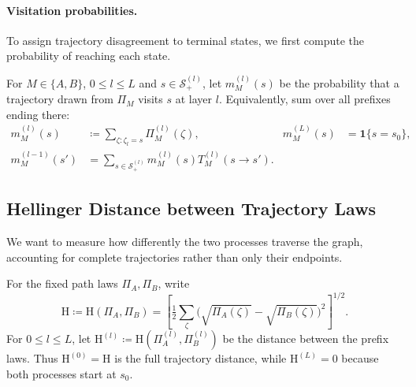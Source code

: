 \paragraph{Visitation probabilities.}\label{ptnb:sec:lmp-marginals}
To assign trajectory disagreement to terminal states, we first compute the probability of reaching each state.
\begin{definition}\label{def:trajectory_marginals}
For $M\in\{A,B\}$, $0\le l\le L$ and $s\in\mathcal S_+^{(l)}$, let $m_M^{(l)}(s)$ be the probability that a trajectory drawn from $\Pi_M$ visits $s$ at layer $l$. Equivalently, sum over all prefixes ending there:
\begin{align}
 m_M^{(l)}(s)&\coloneqq\sum_{\zeta:\zeta_l=s}\Pi_M^{(l)}(\zeta),
 &m_M^{(L)}(s)&=\mathbf1\{s=s_0\},\label{ptnb:eq:lmp-alpha}\\
 m_M^{(l-1)}(s')&=\sum_{s\in\mathcal S^{(l)}_+}m_M^{(l)}(s)T_M^{(l)}(s\to s').\label{ptnb:eq:lmp-alpha-recursion}
\end{align}
\end{definition}

\subsection{Hellinger Distance between Trajectory Laws}\label{ptnb:sec:lmp-bc}

We want to measure how differently the two processes traverse the graph, accounting for complete trajectories rather than only their endpoints.
\begin{definition}\label{def:trajectory_hellinger}
For the fixed path laws $\Pi_A,\Pi_B$, write
\[
 \mathrm H\coloneqq\mathrm H(\Pi_A,\Pi_B)
 =\left[\tfrac12\sum_{\zeta}
 \bigl(\sqrt{\Pi_A(\zeta)}-\sqrt{\Pi_B(\zeta)}\bigr)^2\right]^{1/2}.
\]
For $0\le l\le L$, let $\mathrm H^{(l)}\coloneqq\mathrm H(\Pi_A^{(l)},\Pi_B^{(l)})$ be the distance between the prefix laws. Thus $\mathrm H^{(0)}=\mathrm H$ is the full trajectory distance, while $\mathrm H^{(L)}=0$ because both processes start at $s_0$.
\end{definition}

